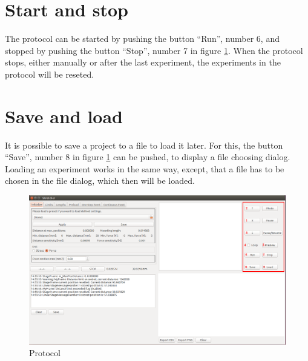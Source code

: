 \section{Start and stop}
The protocol can be started by pushing the button ``Run'', number 6, and stopped by pushing the button ``Stop'', number 7 in figure \ref{fig:protocol}. When the protocol stops, either manually or after the last experiment, the experiments in the protocol will be reseted.

\section{Save and load}
It is possible to save a project to a file to load it later. For this, the button ``Save'', number 8 in figure \ref{fig:protocol} can be pushed, to display a file choosing dialog. Loading an experiment works in the same way, except, that a file has to be chosen in the file dialog, which then will be loaded.

\begin{figure}[!ht]
	\centering
		\includegraphics[width=1.0\textwidth]{images/Protocol}
	\caption{Protocol}
	\label{fig:protocol}
\end{figure}
